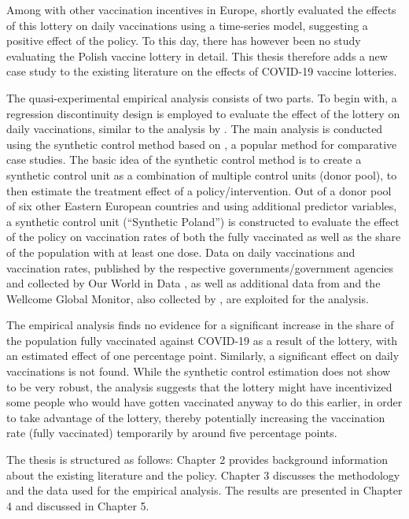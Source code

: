 \documentclass{scrbook}
\begin{document}
Among with other vaccination incentives in Europe,
\textcite{kuznetsova_effectiveness_2022} shortly evaluated the effects
of this lottery on daily vaccinations using a time-series model,
suggesting a positive effect of the policy. To this day, there has
however been no study evaluating the Polish vaccine lottery in detail.
This thesis therefore adds a new case study to the existing literature
on the effects of COVID-19 vaccine lotteries.

The quasi-experimental empirical analysis consists of two parts. To
begin with, a regression discontinuity design is employed to evaluate
the effect of the lottery on daily vaccinations, similar to the analysis
by \textcite{kuznetsova_effectiveness_2022}. The main analysis is
conducted using the synthetic control method based on
\textcite{abadie_economic_2003}, a popular method for comparative case
studies. The basic idea of the synthetic control method is to create a
synthetic control unit as a combination of multiple control units (donor
pool), to then estimate the treatment effect of a policy/intervention.
Out of a donor pool of six other Eastern European countries and using
additional predictor variables, a synthetic control unit (``Synthetic
Poland'') is constructed to evaluate the effect of the policy on
vaccination rates of both the fully vaccinated as well as the share of
the population with at least one dose. Data on daily vaccinations and
vaccination rates, published by the respective governments/government
agencies and collected by Our World in Data
\parencite{mathieu_global_2021}, as well as additional data from
\textcite{eurostat_eurostat_2023} and the Wellcome Global Monitor, also
collected by \textcite{our_world_in_data_share_2020}, are exploited for
the analysis.

The empirical analysis finds no evidence for a significant increase in
the share of the population fully vaccinated against COVID-19 as a
result of the lottery, with an estimated effect of one percentage point.
Similarly, a significant effect on daily vaccinations is not found.
While the synthetic control estimation does not show to be very robust,
the analysis suggests that the lottery might have incentivized some
people who would have gotten vaccinated anyway to do this earlier, in
order to take advantage of the lottery, thereby potentially increasing
the vaccination rate (fully vaccinated) temporarily by around five
percentage points.

The thesis is structured as follows: Chapter 2 provides background
information about the existing literature and the policy. Chapter 3
discusses the methodology and the data used for the empirical analysis.
The results are presented in Chapter 4 and discussed in Chapter 5.
\end{document}
